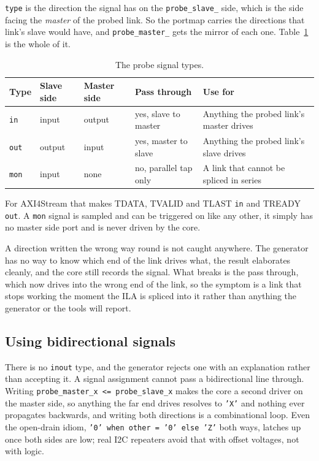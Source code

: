 \documentclass[../manual.tex]{subfiles}
\begin{document}
\texttt{type} is the direction the signal has on the \texttt{probe\_slave\_} side, which is the side facing the \emph{master} of the probed link. So the portmap carries the directions that link's slave would have, and \texttt{probe\_master\_} gets the mirror of each one. Table~\ref{tab:codegen_porttypes} is the whole of it.

\begin{table}[H]
    \centering
    \begin{tabularx}{\textwidth}{|l|l|l|l|X|}
        \hline
        \rowcolor{gray!40} \textbf{Type} & \textbf{Slave side} & \textbf{Master side} & \textbf{Pass through} & \textbf{Use for} \\
        \hline
        \texttt{in}  & input  & output & yes, slave to master & Anything the probed link's master drives \\
        \hline
        \texttt{out} & output & input  & yes, master to slave & Anything the probed link's slave drives \\
        \hline
        \texttt{mon} & input  & none   & no, parallel tap only & A link that cannot be spliced in series \\
        \hline
    \end{tabularx}
    \caption{The probe signal types.}
    \label{tab:codegen_porttypes}
\end{table}

For AXI4Stream that makes TDATA, TVALID and TLAST \texttt{in} and TREADY \texttt{out}. A \texttt{mon} signal is sampled and can be triggered on like any other, it simply has no master side port and is never driven by the core.

A direction written the wrong way round is not caught anywhere. The generator has no way to know which end of the link drives what, the result elaborates cleanly, and the core still records the signal. What breaks is the pass through, which now drives into the wrong end of the link, so the symptom is a link that stops working the moment the ILA is spliced into it rather than anything the generator or the tools will report.

\subsection{Using bidirectional signals}
\label{sec:codegen_inout}

There is no \texttt{inout} type, and the generator rejects one with an explanation rather than accepting it. A signal assignment cannot pass a bidirectional line through. Writing \texttt{probe\_master\_x <= probe\_slave\_x} makes the core a second driver on the master side, so anything the far end drives resolves to \texttt{'X'} and nothing ever propagates backwards, and writing both directions is a combinational loop. Even the open-drain idiom, \texttt{'0' when other = '0' else 'Z'} both ways, latches up once both sides are low; real I2C repeaters avoid that with offset voltages, not with logic.
\end{document}
